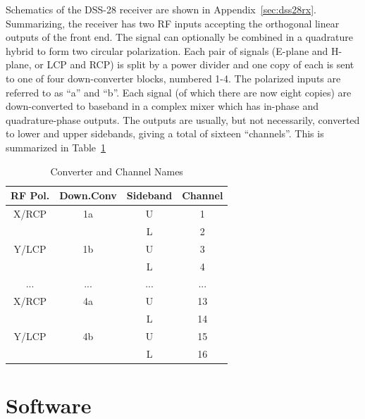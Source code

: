\documentclass[letterpaper,11pt]{report}
\begin{document}
Schematics of the DSS-28 receiver are shown in Appendix~\ref{sec:dss28rx}.
Summarizing, the receiver has two RF inputs accepting the orthogonal linear
outputs of the front end.  The signal can optionally be combined in a
quadrature hybrid to form two circular polarization. Each pair of signals 
(E-plane and H-plane, or LCP and RCP) is split by a power divider and one
copy of each is sent to one of four down-converter blocks, numbered 1-4.
The polarized inputs are referred to as ``a'' and ``b''. Each signal
(of which there are now eight copies) are down-converted to baseband in
a complex mixer which has in-phase and quadrature-phase outputs. The
outputs are usually, but not necessarily, converted to lower and upper
sidebands, giving a total of sixteen ``channels''. This is summarized
in Table~\ref{tab:chnames}
\begin{table}[h!tb]
    \begin{center}
        \caption{\label{tab:chnames}Converter and Channel Names}
        \begin{tabular}{|c|c|c|c|}
            \hline
            RF Pol. &  Down.Conv & Sideband & Channel \\
            \hline
            X/RCP   &  1a        & U        & 1 \\
                    &            & L        & 2 \\
            Y/LCP   &  1b        & U        & 3 \\
                    &            & L        & 4 \\
            \hline
            ...     &   ...      & ...      & ... \\
            \hline
            X/RCP   &  4a        & U        & 13 \\
                    &            & L        & 14 \\
            Y/LCP   &  4b        & U        & 15 \\
                    &            & L        & 16 \\
            \hline
        \end{tabular}
    \end{center}
\end{table}


\section{Software}
\end{document}
